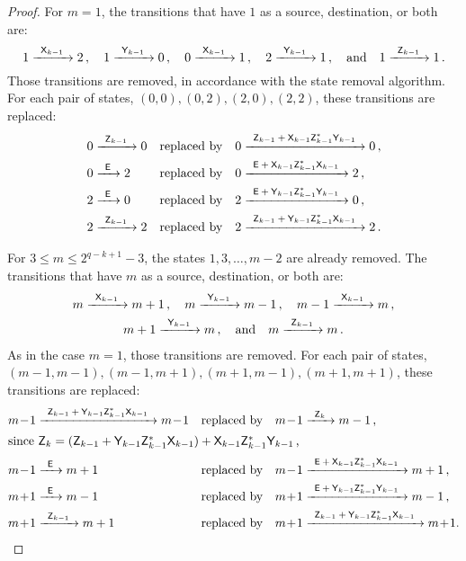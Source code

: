 \begin{proof}
    For $m = 1$, the transitions that have $1$ as a source, destination, or both are:
    \[
        1 {\; \xrightarrow[]{\: \; {\mathsf{X}}_{k-1} \: \;} \;} 2 \, , \quad 1 {\; \xrightarrow[]{\: \; {\mathsf{Y}}_{k-1} \: \;} \;} 0 \, , \quad 0 {\; \xrightarrow[]{\: \; {\mathsf{X}}_{k-1} \: \;} \;} 1 \, , \quad 2 {\; \xrightarrow[]{\: \; {\mathsf{Y}}_{k-1} \: \;} \;} 1 \, , \quad \text{and} \quad 1 {\; \xrightarrow[]{\: \; {\mathsf{Z}}_{k-1} \: \;} \;} 1 \, .
    \]
    Those transitions are removed, in accordance with the state removal algorithm. For each pair of states, $(0,0), (0,2), (2,0), (2,2)$, these transitions are replaced:
    \begin{align*}
        &0 {\; \xrightarrow[]{\: \; {\mathsf{Z}}_{k-1} \: \;} \;} 0 & &\text{replaced by} & &0 {\; \xrightarrow[]{\: \; {\mathsf{Z}}_{k-1} \: + \: {\mathsf{X}}_{k-1}{\mathsf{Z}}_{k-1}^*{\mathsf{Y}}_{k-1} \: \;} \;} 0 \, , \\
        &0 {\; \xrightarrow[]{\: \; {\mathsf{E}} \: \;} \;} 2 & &\text{replaced by} & &0 {\; \xrightarrow[]{\: \; {\mathsf{E}} \: + \: {\mathsf{X}}_{k-1}{\mathsf{Z}}_{k-1}^*{\mathsf{X}}_{k-1} \: \;} \;} 2 \, , \\
        &2 {\; \xrightarrow[]{\: \; {\mathsf{E}} \: \;} \;} 0 & &\text{replaced by} & &2 {\; \xrightarrow[]{\: \; {\mathsf{E}} \: + \: {\mathsf{Y}}_{k-1}{\mathsf{Z}}_{k-1}^*{\mathsf{Y}}_{k-1} \: \;} \;} 0 \, , \\
        &2 {\; \xrightarrow[]{\: \; {\mathsf{Z}}_{k-1} \: \;} \;} 2 & &\text{replaced by} & &2 {\; \xrightarrow[]{\: \; {\mathsf{Z}}_{k-1} \: + \: {\mathsf{Y}}_{k-1}{\mathsf{Z}}_{k-1}^*{\mathsf{X}}_{k-1} \: \;} \;} 2 \, .
    \end{align*}

    For $3 \leq m \leq 2^{q-k+1}-3$, the states $1, 3, \dotsc, m-2$ are already removed. The transitions that have $m$ as a source, destination, or both are:
    \begin{multline*}
        m {\; \xrightarrow[]{\: \; {\mathsf{X}}_{k-1} \: \;} \;} m+1 \, , \quad m {\; \xrightarrow[]{\: \; {\mathsf{Y}}_{k-1} \: \;} \;} m-1 \, , \quad m-1 {\; \xrightarrow[]{\: \; {\mathsf{X}}_{k-1} \: \;} \;} m \, , \\
        m+1 {\; \xrightarrow[]{\: \; {\mathsf{Y}}_{k-1} \: \;} \;} m \, , \quad \text{and} \quad m {\; \xrightarrow[]{\: \; {\mathsf{Z}}_{k-1} \: \;} \;} m \, .
    \end{multline*}
    As in the case $m = 1$, those transitions are removed. For each pair of states, $(m-1,m-1), (m-1,m+1), (m+1,m-1), (m+1,m+1)$, these transitions are replaced:
    \begin{align*}
        &m \! - \! 1 \tr{\re{Z}_{k-1} \: + \: \re{Y}_{k-1}\re{Z}_{k-1}^*\re{X}_{k-1}} m \! - \! 1 & &\text{replaced by} & &m \! - \! 1 \tr{\re{Z}_k} m-1 \, , \\
    \intertext{since $\re{Z}_k = (\re{Z}_{k-1} + \re{Y}_{k-1}\re{Z}_{k-1}^*\re{X}_{k-1}) + \re{X}_{k-1}\re{Z}_{k-1}^*\re{Y}_{k-1} \, $,}
        &m \! - \! 1 \tr{\re{E}} m+1 & &\text{replaced by} & &m \! - \! 1 \tr{\re{E} \: + \: \re{X}_{k-1}\re{Z}_{k-1}^*\re{X}_{k-1}} m+1 \, , \\
        &m \! + \! 1 \tr{\re{E}} m-1 & &\text{replaced by} & &m \! + \! 1 \tr{\re{E} \: + \: \re{Y}_{k-1}\re{Z}_{k-1}^*\re{Y}_{k-1}} m-1 \, , \\
        &m \! + \! 1 \tr{\re{Z}_{k-1}} m+1 & &\text{replaced by} & &m \! + \! 1 \tr{\re{Z}_{k-1} \: + \: \re{Y}_{k-1}\re{Z}_{k-1}^*\re{X}_{k-1}} m \! + \! 1.
    \end{align*}


\end{proof}
